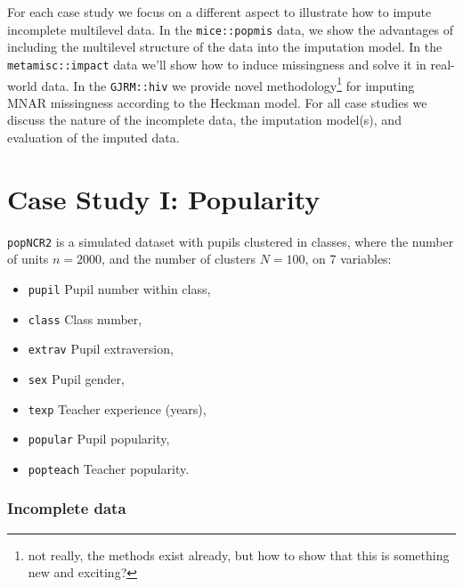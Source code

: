 \documentclass[
]{jss}
\providecommand{\tightlist}{%
  \setlength{\itemsep}{0pt}\setlength{\parskip}{0pt}}
\begin{document}
For each case study we focus on a different aspect to illustrate how to
impute incomplete multilevel data. In the \texttt{mice::popmis} data, we
show the advantages of including the multilevel structure of the data
into the imputation model. In the \texttt{metamisc::impact} data we'll
show how to induce missingness and solve it in real-world data. In the
\texttt{GJRM::hiv} we provide novel methodology\footnote{not really, the
  methods exist already, but how to show that this is something new and
  exciting?} for imputing MNAR missingness according to the Heckman
model. For all case studies we discuss the nature of the incomplete
data, the imputation model(s), and evaluation of the imputed data.

\hypertarget{case-study-i-popularity}{%
\section{Case Study I: Popularity}\label{case-study-i-popularity}}

\texttt{popNCR2} is a simulated dataset with pupils clustered in
classes, where the number of units \(n = 2000\), and the number of
clusters \(N = 100\), on 7 variables:

\begin{itemize}
\tightlist
\item
  \texttt{pupil} Pupil number within class,
\item
  \texttt{class} Class number,
\item
  \texttt{extrav} Pupil extraversion,
\item
  \texttt{sex} Pupil gender,
\item
  \texttt{texp} Teacher experience (years),
\item
  \texttt{popular} Pupil popularity,
\item
  \texttt{popteach} Teacher popularity.
\end{itemize}

\hypertarget{incomplete-data}{%
\subsubsection{Incomplete data}\label{incomplete-data}}
\end{document}
